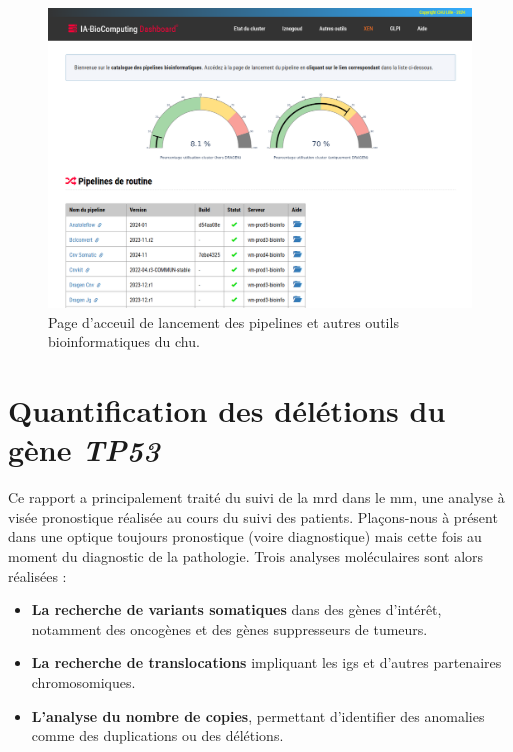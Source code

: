 \begin{figure}[H]
    \centering
    \includegraphics[width=1\textwidth]{images/dashboard_bioinfo.png}
    \caption{
        Page d'acceuil de lancement des pipelines et autres outils bioinformatiques du \gls{chu}.
    }
    \label{fig:bioinfo-dashboard}
\end{figure}

\section{Quantification des délétions du gène \textit{TP53}}

Ce rapport a principalement traité du suivi de la \gls{mrd} dans le \gls{mm}, une analyse à visée pronostique réalisée au cours du suivi des patients.
Plaçons-nous à présent dans une optique toujours pronostique (voire diagnostique) mais cette fois au moment du diagnostic de la pathologie. 
Trois analyses moléculaires sont alors réalisées :

\begin{itemize}
    \item \textbf{La recherche de variants somatiques} dans des gènes d'intérêt, notamment des oncogènes et des gènes suppresseurs de tumeurs.
    \item \textbf{La recherche de translocations} impliquant les \glspl{ig} et d'autres partenaires chromosomiques.
    \item \textbf{L'analyse du nombre de copies}, permettant d'identifier des anomalies comme des duplications ou des délétions.
\end{itemize}

\vspace{1em}

